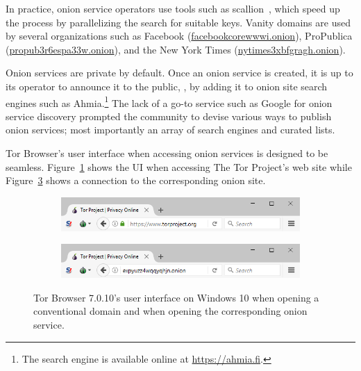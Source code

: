 In practice, onion service operators use tools such as scallion~\cite{scallion},
which speed up the process by parallelizing the search for suitable keys.
Vanity domains are used by several organizations such as Facebook
(\url{facebookcorewwwi.onion}), ProPublica (\url{propub3r6espa33w.onion}), and
the New York Times (\url{nytimes3xbfgragh.onion}).

Onion services are private by default.  Once an onion service is created, it is
up to its operator to announce it to the public, \eg, by adding it to onion site
search engines such as Ahmia.\footnote{The search engine is available online at
\url{https://ahmia.fi}.}  The lack of a go-to service such as Google for onion
service discovery prompted the community to devise various ways to publish onion
services; most importantly an array of search engines and curated lists.

Tor Browser's user interface when accessing onion services is designed to be
seamless.  Figure~\ref{fig:non-onion-service} shows the UI when accessing The
Tor Project's web site while Figure~\ref{fig:onion-service} shows a connection
to the corresponding onion site.

\begin{figure}[t]
    \centering

    \begin{subfigure}[t]{\linewidth}
        \centering
        \includegraphics[width=\linewidth]{figures/non-onion-service.png}
        \label{fig:non-onion-service}
    \end{subfigure}

    \begin{subfigure}[t]{\linewidth}
        \centering
        \includegraphics[width=\linewidth]{figures/onion-service.png}
        \label{fig:onion-service}
    \end{subfigure}

    \caption{Tor Browser 7.0.10's user interface on Windows 10 when opening a
    conventional domain and when opening the corresponding onion service.}
\end{figure}
